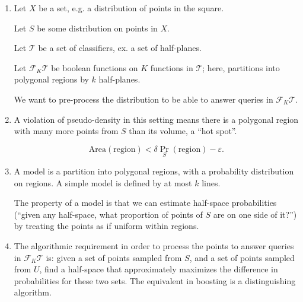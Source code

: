 \begin{enumerate}
\item
Let $X$ be a set, e.g. a distribution of points in the square. %

Let $S$ be some distribution on points in $X$.


Let $\mathcal T$ be a set of classifiers, ex. a set of half-planes.

Let $\mathcal F_K\mathcal T$ be boolean functions on $K$ functions in $\mathcal T$; here, partitions into polygonal regions by $k$ half-planes.

We want to pre-process the distribution to be able to answer queries in $\mathcal F_K\mathcal T$.
\item
A violation of pseudo-density in this setting means there is a polygonal region with many more points from $S$ than its volume, a ``hot spot''.



$$
\text{Area}(\text{region})< \delta \Pr_S (\text{region})-\varepsilon.
$$
\item
A model is a partition into polygonal regions, with a probability distribution on regions. A simple model is defined by at most $k$ lines. 

The property of a model is that we can estimate half-space probabilities (``given any half-space, what proportion of points of $S$ are on one side of it?'') by treating the points as if uniform within regions.


\item
The algorithmic requirement in order to process the points to answer queries in $\mathcal F_K\mathcal T$ is:  given a set of points sampled from $S$, and a set of points sampled from $U$, find a half-space that approximately maximizes the difference in probabilities for these two sets. The equivalent in boosting is a distinguishing algorithm.
\end{enumerate}

